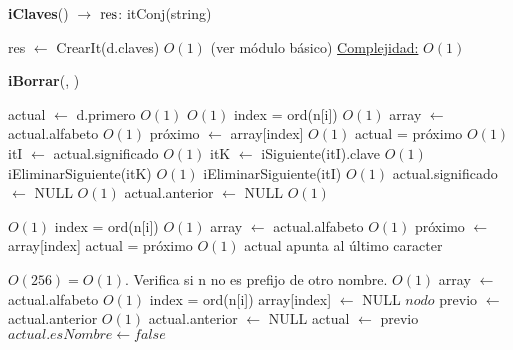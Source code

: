\begin{Algoritmos}
\begin{algorithm}[H]{\textbf{iClaves}() $\to$ $\res$: itConj(string)}
	\begin{algorithmic}
       	\State res $\gets$ CrearIt(d.claves) \Comment $O(1)$ (ver módulo básico)
	    \Statex \underline{Complejidad:} $O(1)$
    \end{algorithmic}
\end{algorithm}

\begin{algorithm}[H]{\textbf{iBorrar}(, )}




	\begin{algorithmic}
    \State actual $\gets$ d.primero \Comment $O(1)$
     \Comment $O(1)$
	\State index = ord(n[i]) \Comment $O(1)$
    \State array $\gets$ actual.alfabeto  \Comment $O(1)$
    \State próximo $\gets$ array[index] \Comment $O(1)$
	\State actual = próximo \Comment $O(1)$
    \EndFor
	\State itI $\gets$ actual.significado \Comment $O(1)$
    \State itK $\gets$ iSiguiente(itI).clave \Comment $O(1)$
    \State iEliminarSiguiente(itK) \Comment $O(1)$
    \State iEliminarSiguiente(itI) \Comment $O(1)$
    \State actual.significado $\gets$ NULL \Comment $O(1)$
	\State actual.anterior $\gets$ NULL \Comment $O(1)$
    
     \Comment $O(1)$
	\State index = ord(n[i]) \Comment $O(1)$
    \State array $\gets$ actual.alfabeto  \Comment $O(1)$
    \State próximo $\gets$ array[index]
	\State actual = próximo \Comment $O(1)$
    \EndFor \Comment actual apunta al último caracter

		\Comment $O(256) = O(1)$. Verifica si n no es prefijo de otro nombre.
    	 \Comment $O(1)$
	    \State array $\gets$ actual.alfabeto  \Comment $O(1)$
	   	\State index = ord(n[i])
	    \State array[index] $\gets$ NULL
	    \State $nodo$ previo $\gets$ actual.anterior \Comment $O(1)$
	    \State actual.anterior $\gets$ NULL
	    \State actual $\gets$ previo
	    \EndFor
    \Else
    	\State $actual.esNombre \gets false$
    \EndIf
    

\end{algorithmic}
\end{algorithm}
\end{Algoritmos}
